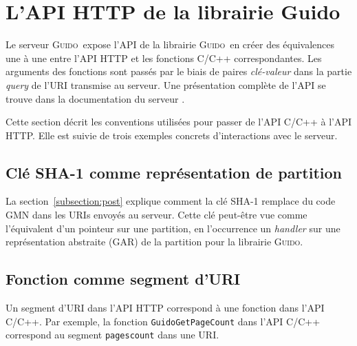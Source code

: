 \documentclass{article}
\newcommand{\guido}		{\textsc{Guido}}
\begin{document}
\section{L'API HTTP de la librairie Guido}\label{section:guido-api}
Le serveur \guido\ expose l'API de la librairie \guido\ en créer des équivalences une à une entre l'API HTTP et les fonctions C/C++ correspondantes. Les arguments des fonctions sont passés par le biais de paires \emph{clé-valeur} dans la partie \emph{query} de l'URI transmise au serveur. Une présentation complète de l'API se trouve dans la documentation du serveur \cite{guidoserverdoc}.\par

Cette section décrit les conventions utilisées pour passer de l'API C/C++ à l'API HTTP. Elle est suivie de trois exemples concrets d'interactions avec le serveur. 

\subsection{Clé SHA-1 comme représentation de partition}
La section~\ref{subsection:post} explique comment la clé SHA-1 remplace du code GMN dans les URIs envoyés au serveur. Cette clé peut-être vue comme l'équivalent d'un pointeur sur une partition, en l'occurrence un \emph{handler} sur une représentation abstraite (GAR) de la partition pour la librairie \guido .


\subsection{Fonction comme segment d'URI}
Un segment d'URI dans l'API HTTP correspond à une fonction dans l'API C/C++. Par exemple, la fonction \verb=GuidoGetPageCount= dans l'API C/C++ correspond au segment \verb=pagescount= dans une URI.
\end{document}
